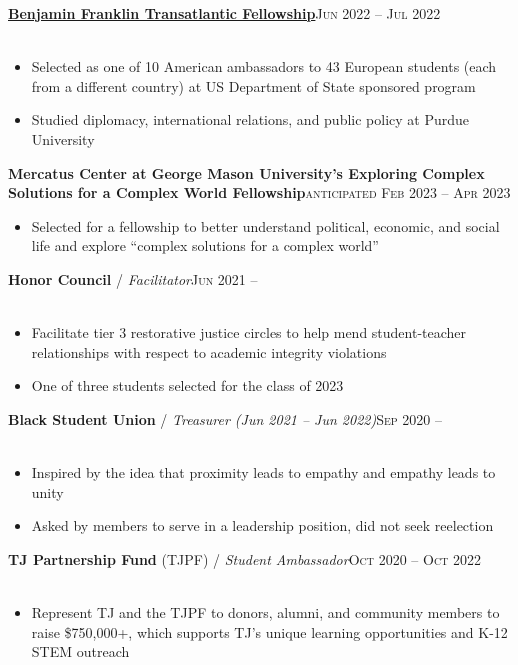\documentclass[12pt, a4paper]{article}
\begin{document}
\textbf{\href{https://www.education.purdue.edu/ben-franklin-institute/}{Benjamin Franklin Transatlantic Fellowship}}\hfill\textsc{Jun 2022 -- Jul 2022}\\\
\begin{itemize}
    \vspace{-8mm}
    \item Selected as one of 10 American ambassadors to 43 European students (each from a different country) at US Department of State sponsored program
    \item Studied diplomacy, international relations, and public policy at Purdue University
\end{itemize}

\textbf{Mercatus Center at George Mason University’s Exploring Complex Solutions for a Complex World Fellowship}\hfill\textsc{anticipated Feb 2023 -- Apr 2023}\\
\begin{itemize}
    \vspace{-8mm}
    \item Selected for a fellowship to better understand political, economic, and social life and explore ``complex solutions for a complex world''
\end{itemize}

\textbf{Honor Council} / \textit{Facilitator}\hfill\textsc{Jun 2021 --}\\\
\begin{itemize}
    \vspace{-8mm}
    \item Facilitate tier 3 restorative justice circles to help mend student-teacher relationships with respect to academic integrity violations
    \item One of three students selected for the class of 2023
\end{itemize}

\textbf{Black Student Union} / \textit{Treasurer (Jun 2021 -- Jun 2022)}\hfill\textsc{Sep 2020 --}\\\
\begin{itemize}
    \vspace{-8mm}
    \item Inspired by the idea that proximity leads to empathy and empathy leads to unity
    \item Asked by members to serve in a leadership position, did not seek reelection
\end{itemize}

\textbf{TJ Partnership Fund} (TJPF) / \textit{Student Ambassador}\hfill\textsc{Oct 2020 -- Oct 2022}\\\
\begin{itemize}
    \vspace{-8mm}
    \item Represent TJ and the TJPF to donors, alumni, and community members to raise \$750,000+, which supports TJ's unique learning opportunities and K-12 STEM outreach
\end{itemize}
\end{document}
